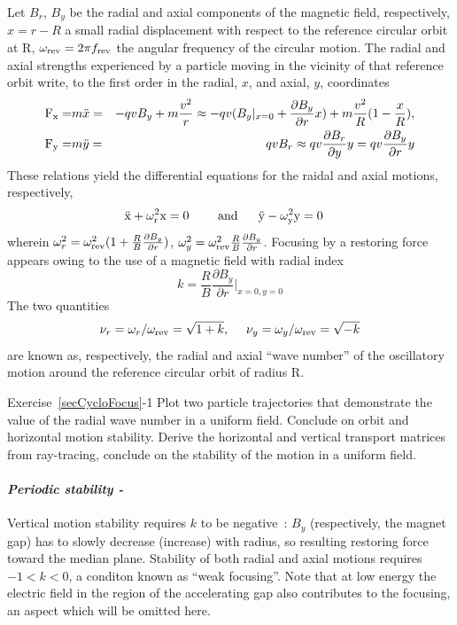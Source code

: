 Let $B_r$, $B_y$  be the radial and axial components of the magnetic field, respectively, 
$x=r-R$ a small radial displacement with respect to the reference circular orbit at R,  
$\omega_{\rm rev} = 2\pi f_{\rm rev} $ the angular frequency of the circular motion. 
The radial and axial  strengths experienced by a particle moving in the vicinity of that reference orbit 
write, to the first order in the radial, $x$,  and axial, $y$, coordinates 
\begin{eqnarray}
\label{EqCycloFoc}
\rm
F_x = & m \ddot x=&  -qvB_y + m\frac{v^2}{r} \approx -q v (B_y|_{x=0} + \frac{\partial B_y}{\partial r}x)  + m\frac{v^2}{R}(1-\frac{x}{R}),   \nonumber \\ 
\rm 
F_y= & m\ddot y = &  qvB_r \approx q v \frac{\partial B_r}{\partial y} y = q v \frac{\partial B_y}{\partial r} y
\end{eqnarray}
These relations yield the differential equations for the raidal and axial motions, respectively, 
\begin{eqnarray}
\label{EqCycloDiffEq}
\rm
  \ddot x + \omega_r^2 x=0 &  \ \ \ \ \ \ \ \rm and \ \ \ \ \
  \ddot{y} - \omega_y^2 y= 0  
\end{eqnarray}
wherein 
$\omega_r^2 = \omega_{\rm rev}^2(1+\frac{R}{B}\frac{\partial B_y}{\partial r})$,  
$ \omega_y^2 = \omega_{\rm rev}^2 \frac{R}{B} \frac{\partial B_y}{\partial r}$. 
Focusing by a restoring force appears owing to the use of a magnetic field with radial 
index 
\begin{equation}
\label{EqCycloRadialIndex}
k = \frac{R}{B}\frac{\partial B_y}{\partial r}|_{x=0,y=0} 
\end{equation}
The two quantities 
\begin{equation}
  \nu_r = \omega_r/\omega_{\rm rev} = \sqrt{1+k},   ~ ~ ~ ~ 
 \nu_y=\omega_y /\omega_{\rm rev}  = \sqrt{-k} 
\end{equation}
are known  as, respectively, the radial and axial ``wave number'' of 
the oscillatory motion around the reference circular orbit of radius R.

\smallskip
\noindent {\small $\bullet$} Exercise~\ref{secCycloFocus}-1
Plot two particle trajectories that demonstrate the value of the radial wave number in a uniform 
field. Conclude on orbit and horizontal motion  stability. 
Derive the horizontal and vertical  transport matrices from ray-tracing, conclude on the stability of the 
 motion in a uniform field.


\paragraph{\sl Periodic stability  \label{secCycloPerStab} - }
Vertical motion stability requires $k$ to be negative~:  $B_y$ (respectively, the magnet gap) 
has to  slowly  decrease (increase) with radius, so resulting restoring force toward the median plane. 
Stability of both radial and axial motions requires $-1 < k <0$, a conditon known as ``weak focusing''.
 Note that  at low energy  the electric field in the 
region of the accelerating gap also contributes to the focusing, an aspect which will be omitted here. 


